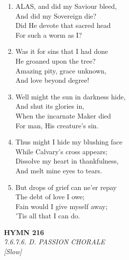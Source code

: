 \documentclass[11pt,a4paper]{article}
\begin{document}
\begin{enumerate}
    \item ALAS, and did my Saviour bleed, \\
            And did my Sovereign die? \\
        Did He devote that sacred head \\
            For such a worm as I?

    \item Was it for sins that I had done \\
            He groaned upon the tree? \\
        Amazing pity, grace unknown, \\
            And love beyond degree!

    \item Well might the sun in darkness hide, \\
            And shut its glories in, \\
        When the incarnate Maker died \\
            For man, His creature's sin.

    \item Thus might I hide my blushing face \\
            While Calvary's cross appears; \\
        Dissolve my heart in thankfulness, \\
            And melt mine eyes to tears.

    \item But drops of grief can ne'er repay \\
            The debt of love I owe; \\
        Fain would I give myself away; \\
            'Tis all that I can do.

\end{enumerate}

\newpage
\begin{center}
    {\Large \textbf{HYMN 216}}
    \\
    \textit{7.6.7.6. D. PASSION CHORALE}
    \\
    \textit{\small [Slow]}
\end{center}
\vspace{1em}
\end{document}
